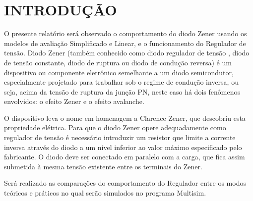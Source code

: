 \chapter{INTRODUÇÃO}

O presente relatório será observado o comportamento do diodo Zener usando os modelos de avaliação Simplificado e Linear, e o funcionamento do Regulador de tensão. 
Diodo Zener (também conhecido como diodo regulador de tensão , diodo de tensão constante, diodo de ruptura ou diodo de condução reversa) é um dispositivo ou componente eletrônico semelhante a um diodo semicondutor, especialmente projetado para trabalhar sob o regime de condução inversa, ou seja, acima da tensão de ruptura da junção PN, neste caso há dois fenômenos envolvidos: o efeito Zener e o efeito avalanche. 

O dispositivo leva o nome em homenagem a Clarence Zener, que descobriu esta propriedade elétrica. Para que o diodo Zener opere adequadamente como regulador de tensão é necessário introduzir um resistor que limite a corrente inversa através do diodo a um nível inferior ao valor máximo especificado pelo fabricante. O diodo deve ser conectado em paralelo com a carga, que fica assim submetida à mesma tensão existente entre os terminais do Zener.

Será realizado as comparações do comportamento do Regulador entre os modos teóricos e práticos no qual serão simulados no programa Multisim. 
